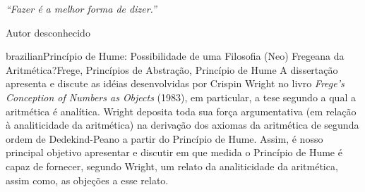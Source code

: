 \documentclass[diss]{UFRuralRJ}
\begin{document}



\clearpage\mbox{}\vfill\hspace{80mm}\begin{minipage}{76mm}\begin{flushright}{\em
``Fazer é a melhor forma de dizer.''
\par
Autor desconhecido
}\end{flushright}\end{minipage}

\def\tituloportugues{Princípio de Hume: Possibilidade de uma Filosofia (Neo) Fregeana da Aritmética?}
\def\chavesportugues{Frege, Princípios de Abstração, Princípio de Hume} %

\begin{generalabstract}{brazilian}{\tituloportugues}{\chavesportugues} %
  A dissertação apresenta e discute as idéias desenvolvidas por Crispin Wright 
  no livro \textit{Frege’s Conception of Numbers as Objects} (1983), em 
  particular, a tese segundo a qual a aritmética é analítica. Wright deposita 
  toda sua força argumentativa (em relação à analiticidade da aritmética) na 
  derivação dos axiomas da aritmética de segunda ordem de Dedekind-Peano a 
  partir do Princípio de Hume. Assim, é nosso principal objetivo apresentar e 
  discutir em que medida o Princípio de Hume é capaz de fornecer, segundo 
  Wright, um relato da analiticidade da aritmética, assim como, as objeções a 
  esse relato.
\end{generalabstract}

\def\tituloingles{Hume's Principle: Possibility of a (Neo) Fregean Philosophy 
  of Arithmetic?} %
\def\chavesingles{Frege, Abstraction Principles, Hume's Principle} %
\end{document}

